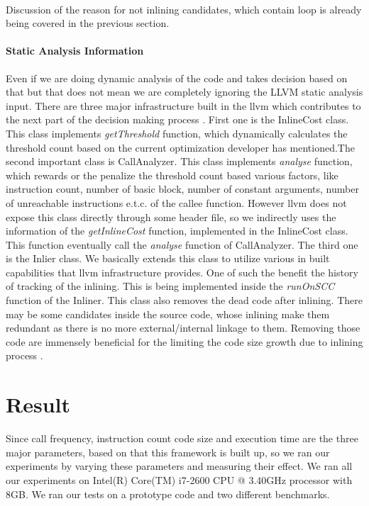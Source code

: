 \documentclass{sigplanconf}
\begin{document}
    \paragraph{} Discussion of the reason for not inlining candidates, which contain loop is already being covered in the previous section.

	  \paragraph{Static Analysis Information} Even if we are doing dynamic analysis of the code and takes decision based on that but that does not  mean we are completely ignoring the LLVM static analysis input. There are three major infrastructure built in the llvm which contributes to the next part of the decision making process \cite{llvm_doc}. First one is the InlineCost class. This class implements \textit{getThreshold} function, which dynamically calculates the threshold count based on the current optimization developer has mentioned.The second important class is CallAnalyzer. This class implements \textit{analyse} function, which rewards or the penalize the threshold count based various factors, like instruction count, number of basic block, number of constant arguments, number of unreachable instructions e.t.c. of the callee function. However llvm does not expose this class directly through some header file, so we indirectly uses the information of the \textit{getInlineCost} function, implemented in the InlineCost class. This function eventually call the \textit{analyse} function of CallAnalyzer. The third one is the Inlier class. We basically extends this class to utilize various in built capabilities that llvm infrastructure provides. One of such the benefit the history of tracking of the inlining. This is being implemented inside the \textit{runOnSCC} function of the Inliner. This class also removes the dead code after inlining. There may be some candidates inside the source code, whose inlining make them redundant as there is no more external/internal linkage to them. Removing those code are immensely beneficial for the limiting the code  size growth due to inlining process .
	  
\section{Result}
Since call frequency, instruction count code size and execution time are the three major parameters, based on that this framework is built up, so we ran our experiments by varying these parameters and measuring their effect. We ran all our experiments on  Intel(R) Core(TM) i7-2600 CPU @ 3.40GHz processor with 8GB. We ran our tests on a prototype code and two different benchmarks.
\end{document}
